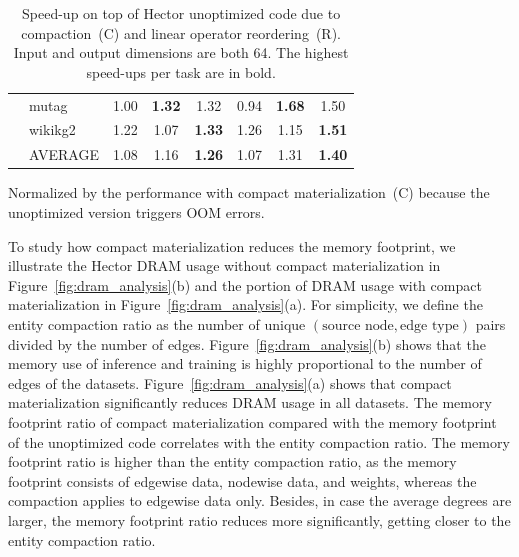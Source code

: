 \begin{table}[htbp!]
\begin{tabular}{clccc|ccc}
& mutag   & \cellcolor[HTML]{FEFDFD}1.00 & \cellcolor[HTML]{D9E5D4}\textbf{1.32} & \cellcolor[HTML]{DAE6D5}1.32          & \cellcolor[HTML]{F4D7D1}0.94 & \cellcolor[HTML]{AFC8A4}\textbf{1.68} & \cellcolor[HTML]{C4D6BC}1.50          \\
& wikikg2 & \cellcolor[HTML]{E6EEE2}1.22 & \cellcolor[HTML]{F7FAF6}1.07          & \cellcolor[HTML]{D8E5D3}\textbf{1.33} & \cellcolor[HTML]{E1EBDD}1.26 & \cellcolor[HTML]{EDF3EB}1.15          & \cellcolor[HTML]{C3D6BB}\textbf{1.51} \\
& AVERAGE & \cellcolor[HTML]{F6F9F5}1.08 & \cellcolor[HTML]{ECF2EA}1.16          & \cellcolor[HTML]{E1EADD}\textbf{1.26} & \cellcolor[HTML]{F7F9F5}1.07 & \cellcolor[HTML]{DBE6D6}1.31          & \cellcolor[HTML]{D0DFCA}\textbf{1.40}
        \\
\bottomrule
\end{tabular}
\begin{flushleft} \footnotesize *Normalized by the performance with compact materialization~(C) because the unoptimized version triggers OOM errors. 
\end{flushleft}
\caption{Speed-up on top of Hector unoptimized code due to compaction~(C) and linear operator reordering~(R). Input and output dimensions are both 64. The highest speed-ups per task are in bold. }
\label{tab:optimizations}
\end{table}

To study how compact materialization reduces the memory footprint, we illustrate the Hector DRAM usage without compact materialization in Figure~\ref{fig:dram_analysis}(b) and the portion of DRAM usage with compact materialization in Figure~\ref{fig:dram_analysis}(a). For simplicity, we define the entity compaction ratio as the number of unique $(\text{source node}, \text{edge type})$ pairs divided by the number of edges. Figure~\ref{fig:dram_analysis}(b) shows that the memory use of inference and training is highly proportional to the number of edges of the datasets. Figure~\ref{fig:dram_analysis}(a) shows that compact materialization significantly reduces DRAM usage in all datasets. The memory footprint ratio of compact materialization compared with the memory footprint of the unoptimized code correlates with the entity compaction ratio. The memory footprint ratio is higher than the entity compaction ratio, as the memory footprint consists of edgewise data, nodewise data, and weights, whereas the compaction applies to edgewise data only. Besides, in case the average degrees are larger, the memory footprint ratio reduces more significantly, getting closer to the entity compaction ratio.


